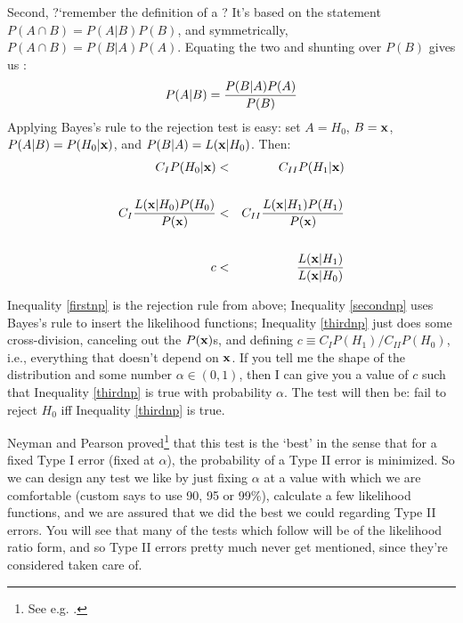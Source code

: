 Second, ?`remember the definition of a ? It's based on the
statement $P(A\cap B)=P(A|B)P(B)$, and symmetrically, $P(A\cap B)=P(B|A)P(A)$.  Equating
the two and shunting over $P(B)$ gives us : $$P(A|B)={P(B|A) P(A)\over P(B)}$$
Applying Bayes's rule to the rejection test is easy: set $A=H_0$, $B={\bf x}$,
$P(A|B)=P(H_0|{\bf x})$, and $P(B|A)=L({\bf x}|H_0)$. Then:
\begin{align}
C_I P(H_0|{\bf x})&<&C_{II} P(H_1|{\bf x})\label{firstnp}\\
\nonumber\\
C_I {L({\bf x}|H_0)P(H_0)\over P({\bf x})}&<& C_{II} {L({\bf x}|H_1)P(H_1)\over P({\bf x})}\label{secondnp}\\
\nonumber\\
c&<& {L({\bf x}|H_1)\over L({\bf x}|H_0)}\label{thirdnp}
\end{align}

Inequality \ref{firstnp} is the rejection rule from above; Inequality
\ref{secondnp} uses Bayes's rule to insert the likelihood functions;
Inequality \ref{thirdnp} just does some cross-division, canceling out the
$P({\bf x})$s, and defining $c\equiv C_IP(H_1)/C_{II}P(H_0)$, i.e., everything
that doesn't depend on ${\bf x}$. If you tell me the shape of the distribution
and some number $\alpha\in(0,1)$, then I can give you a value of $c$
such that Inequality \ref{thirdnp} is true with probability
$\alpha$. The test will then be: fail to reject $H_0$ iff Inequality
\ref{thirdnp} is true.

Neyman and Pearson proved\footnote{See
e.g. \citet[189--191]{amemiya:ez}.}
that this test is the `best' in the sense that for a
fixed Type I error (fixed at $\alpha$), the probability of a Type II
error is minimized. So we can design any test we like by just fixing $\alpha$
at a value with which we are comfortable (custom says to use
90, 95 or 99\%), calculate a few likelihood functions, and we are assured
that we did the best we could regarding Type II errors. You will see that
many of the tests which follow will be of the likelihood ratio form,
and so Type II errors pretty much never get mentioned, since they're
considered taken care of.

